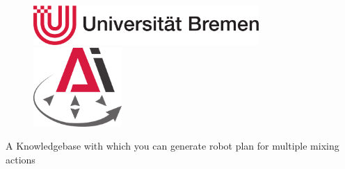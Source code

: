 \documentclass[	pdftex, 
								a4paper,
								11pt, DIV11, BCOR5mm,
								parskip,
								]{scrreprt}
\begin{document}
\setcounter{page}{-2}
\pagestyle{empty}
\newcommand{\firstreviewer}{Prof. Michael Beetz PhD}
\newcommand{\secondreviewer}{}
\newcommand{\supervisor}{Michaela Kümpel}
\newcommand{\thesistype}{Master Thesis}
\newcommand{\myauthor}{Naser Azizi, Sorin Arion}
\newcommand{\mymaintitle}{A Knowledgebase with which you can generate robot plan for multiple mixing actions}
\newcommand{\mysubtitle}{A nutrition ontology with web interface for customer specific dietary \newline recommendations} 
\newcommand{\mytitle}{\centering {\Huge \mymaintitle}\\[.3in] 
    {\Large \mysubtitle}}
\newcommand{\pdftitle}{\mymaintitle - \mysubtitle}
\newcommand{\formattedfronttitle}{{\mytitle}}
\newcommand{\formattedinnertitle}{{\mytitle}}

\begin{titlepage}
	\vspace*{-2.2cm}
	\begin{adjustwidth}{-0cm}{-2.3cm}
	\thispagestyle{empty}
        \begin{figure}
            \begin{minipage}{.4\linewidth}
	\begin{flushleft}
		\includegraphics[height=1.5cm]{Graphics/unilogo-transp.pdf}
	\end{flushleft}
    \end{minipage}
    \hspace{.2\linewidth}
            \begin{minipage}{.4\linewidth}
	\begin{flushright}
		\includegraphics[height=3.0cm]{Graphics/logo-ai-small.pdf}
	\end{flushright}
    \end{minipage}
\end{figure}
	  \vfill
	\begin{center}
	  {\huge \mymaintitle}\\
	  

\end{center}
\end{adjustwidth}
\end{titlepage}
\end{document}
